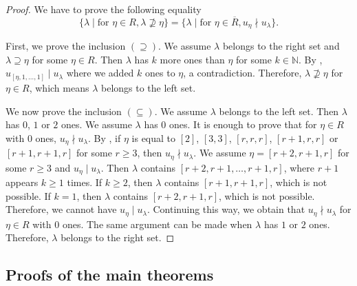\documentclass[a4paper, 12pt, reqno]{amsart}
\theoremstyle{remark}
\numberwithin{equation}{subsection}
\begin{document}
\begin{proof}
  We have to prove the following equality
  \begin{equation*}
    \{\lambda \mid \text{for }\eta \in R, \lambda \nsupseteq \eta\} = \{\lambda \mid \text{for }\eta \in \overline{R}, u_{\eta} \nmid u_{\lambda}\}.
  \end{equation*}

  First, we prove the inclusion $(\supseteq)$.
  We assume $\lambda$ belongs to the right set and $\lambda \supseteq \eta$ for some $\eta \in R$.
  Then $\lambda$ has $k$ more ones than $\eta$ for some $k \in \mathbb{N}$.
  By , $u_{[\eta, 1, \dots, 1]} \mid u_{\lambda}$ where we added $k$ ones to $\eta$, a contradiction.
  Therefore, $\lambda \nsupseteq \eta$ for $\eta \in R$, which means $\lambda$ belongs to the left set.

  We now prove the inclusion $(\subseteq)$.
  We assume $\lambda$ belongs to the left set.
  Then $\lambda$ has $0$, $1$ or $2$ ones.
  We assume $\lambda$ has $0$ ones.
  It is enough to prove that for $\eta \in R$ with $0$ ones, $u_{\eta} \nmid u_{\lambda}$.
  By , if $\eta$ is equal to $[2]$, $[3, 3]$, $[r, r, r]$, $[r + 1, r, r]$ or $[r + 1, r + 1, r]$ for some $r \ge 3$, then $u_{\eta} \nmid u_{\lambda}$.
  We assume $\eta = [r + 2, r + 1, r]$ for some $r \ge 3$ and $u_{\eta} \mid u_{\lambda}$.
  Then $\lambda$ contains $[r + 2, r + 1, \dots, r + 1, r]$, where $r + 1$ appears $k \ge 1$ times.
  If $k \ge 2$, then $\lambda$ contains $[r + 1, r + 1, r]$, which is not possible.
  If $k = 1$, then $\lambda$ contains $[r + 2, r + 1, r]$, which is not possible.
  Therefore, we cannot have $u_{\eta} \mid u_{\lambda}$.
  Continuing this way, we obtain that $u_{\eta} \nmid u_{\lambda}$ for $\eta \in R$ with $0$ ones.
  The same argument can be made when $\lambda$ has $1$ or $2$ ones.
  Therefore, $\lambda$ belongs to the right set.
\end{proof}

\subsection{Proofs of the main theorems}
\label{sec:proofs-main-theorems}
\end{document}
